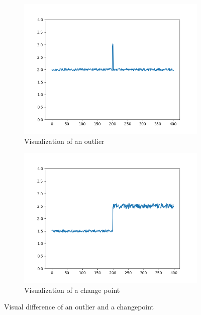 \documentclass[	runningheads,
				a4paper]{llncs}
\begin{document}
	\begin{figure}[ht!]
		\centering
		\begin{subfigure}[b]{0.45\textwidth}
			\centering
			\includegraphics[width=\textwidth]{outlier}
			\caption{Visualization of an outlier}
		\end{subfigure}
		\begin{subfigure}[b]{0.45\textwidth}
			\centering
			\includegraphics[width=\textwidth]{changepoint}
			\caption{Visualization of a change point}
		\end{subfigure}
		\caption{Visual difference of an outlier and a changepoint}
		\label{fig:outlier_cp}
	\end{figure}
\end{document}
